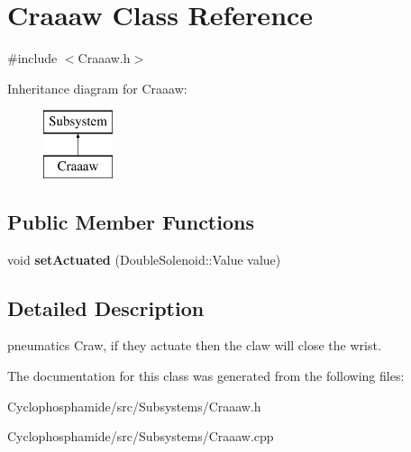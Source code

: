 \hypertarget{class_craaaw}{}\section{Craaaw Class Reference}
\label{class_craaaw}


{\ttfamily \#include $<$Craaaw.\+h$>$}

Inheritance diagram for Craaaw\+:\begin{figure}[H]
\begin{center}
\leavevmode
\includegraphics[height=2.000000cm]{class_craaaw}
\end{center}
\end{figure}
\subsection*{Public Member Functions}
\begin{DoxyCompactItemize}
\item 
\hypertarget{class_craaaw_abb987915a2085d9a12eb11ce5854cb7d}{}void {\bfseries set\+Actuated} (Double\+Solenoid\+::\+Value value)\label{class_craaaw_abb987915a2085d9a12eb11ce5854cb7d}

\end{DoxyCompactItemize}


\subsection{Detailed Description}
pneumatics Craw, if they actuate then the claw will close the wrist. 

The documentation for this class was generated from the following files\+:\begin{DoxyCompactItemize}
\item 
Cyclophosphamide/src/\+Subsystems/Craaaw.\+h\item 
Cyclophosphamide/src/\+Subsystems/Craaaw.\+cpp\end{DoxyCompactItemize}
